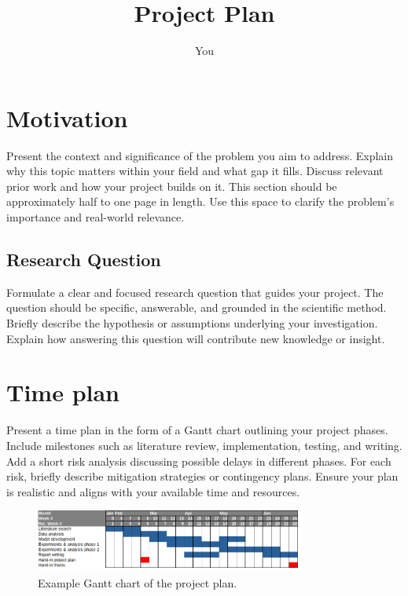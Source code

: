 \documentclass{article}
\title{Project Plan}
\author{You}
\begin{document}
\maketitle

\section*{Motivation}
Present the context and significance of the problem you aim to address.
Explain why this topic matters within your field and what gap it fills.
Discuss relevant prior work and how your project builds on it.
This section should be approximately half to one page in length.
Use this space to clarify the problem’s importance and real-world relevance.

\subsection*{Research Question}
Formulate a clear and focused research question that guides your project.
The question should be specific, answerable, and grounded in the scientific method.
Briefly describe the hypothesis or assumptions underlying your investigation.
Explain how answering this question will contribute new knowledge or insight.

\section*{Time plan}
Present a time plan in the form of a Gantt chart outlining your project phases.
Include milestones such as literature review, implementation, testing, and writing.
Add a short risk analysis discussing possible delays in different phases.
For each risk, briefly describe mitigation strategies or contingency plans.
Ensure your plan is realistic and aligns with your available time and resources.

\begin{figure}
\centering
\includegraphics[width=0.8\textwidth]{time_plan.png}
\caption{Example Gantt chart of the project plan.}
\end{figure}

\nocite{*}


\end{document}
